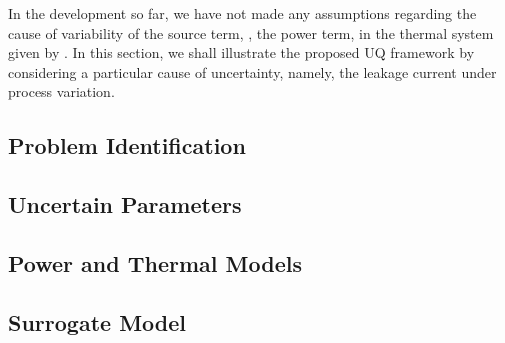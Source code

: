 In the development so far, we have not made any assumptions regarding the cause of variability of the source term, \ie, the power term, in the thermal system given by . In this section, we shall illustrate the proposed UQ framework by considering a particular cause of uncertainty, namely, the leakage current under process variation.

\subsection{Problem Identification} 


\subsection{Uncertain Parameters} 


\subsection{Power and Thermal Models}  


\subsection{Surrogate Model} 

